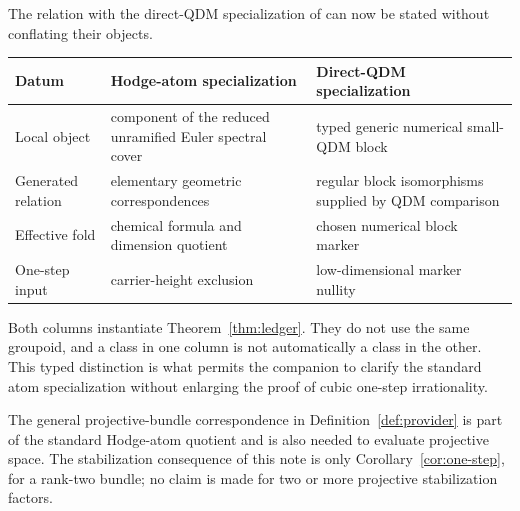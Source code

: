The relation with the direct-QDM specialization of \cite{Epilogue} can now be
stated without conflating their objects.
\begin{center}
\begin{tabular}{@{}>{\raggedright\arraybackslash}p{}
                    >{\raggedright\arraybackslash}p{}
                    >{\raggedright\arraybackslash}p{}@{}}
\toprule
Datum & Hodge-atom specialization & Direct-QDM specialization \\
\midrule
Local object & component of the reduced unramified Euler spectral cover &
  typed generic numerical small-QDM block \\
Generated relation & elementary geometric correspondences &
  regular block isomorphisms supplied by QDM comparison \\
Effective fold & chemical formula and dimension quotient &
  chosen numerical block marker \\
One-step input & carrier-height exclusion & low-dimensional marker nullity \\
\bottomrule
\end{tabular}
\end{center}
Both columns instantiate Theorem~\ref{thm:ledger}.  They do not use the same
groupoid, and a class in one column is not automatically a class in the
other.  This typed distinction is what permits the companion to clarify the
standard atom specialization without enlarging the proof of cubic one-step
irrationality.

The general projective-bundle correspondence in
Definition~\ref{def:provider} is part of the standard Hodge-atom quotient and
is also needed to evaluate projective space.  The stabilization consequence
of this note is only Corollary~\ref{cor:one-step}, for a rank-two bundle; no
claim is made for two or more projective stabilization factors.
